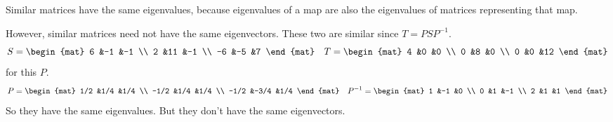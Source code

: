 \documentclass[10pt,t]{beamer}
\begin{document}
\begin{frame}
Similar matrices have the same eigenvalues, because
eigenvalues of a map are also the eigenvalues of matrices representing
that map.

\pause
However, 
similar matrices need not have the same eigenvectors.
\medskip
\ex
These two are similar since $T=PSP^{-1}$.
\begin{equation*}
  S=
  \begin{mat}
    6 &-1  &-1 \\
    2 &11  &-1 \\
   -6 &-5  &7
  \end{mat}
  \quad
  T=
  \begin{mat}
    4 &0 &0 \\
    0 &8 &0 \\
    0 &0 &12
  \end{mat}
\end{equation*}
for this $P$.
\begin{equation*}
  P=
  \begin{mat}
    1/2 &1/4  &1/4 \\
   -1/2 &1/4  &1/4 \\
   -1/2 &-3/4 &1/4
  \end{mat}
  \quad
  P^{-1}=
  \begin{mat}
    1 &-1 &0 \\
    0 &1 &-1 \\
    2 &1 &1
  \end{mat}
\end{equation*}
So they have the same eigenvalues.
But they don't have the same eigenvectors.
\end{frame}
\end{document}
